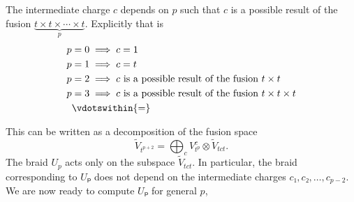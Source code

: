 The intermediate charge $c$ depends on $p$ such that $c$ is a possible result of the fusion $\underbrace{t \times t \times \cdots \times t}_{p}$. Explicitly that is
\begin{equation}
  \begin{aligned}
    p &= 0 \implies c = 1 \\
    p &= 1 \implies c = t \\
    p &= 2 \implies c \text{ is a possible result of the fusion } t \times t \\
    p &= 3 \implies c \text{ is a possible result of the fusion } t \times t \times t \\
    & \vdotswithin{=}
  \end{aligned}
\end{equation}

This can be written as a decomposition of the fusion space
\begin{equation}
  \widetilde{V}_{t^{p+2}} = ⨁_c V_{t^p}^c ⊗ \widetilde{V}_{tct}.
\end{equation}
The braid $U_p$ acts only on the subspace $\widetilde{V}_{tct}$. In particular, the braid corresponding to $Uₚ$ does not depend on the intermediate charges $c₁, c₂, …, c_{p-2}$. We are now ready to compute $Uₚ$ for general $p$,

